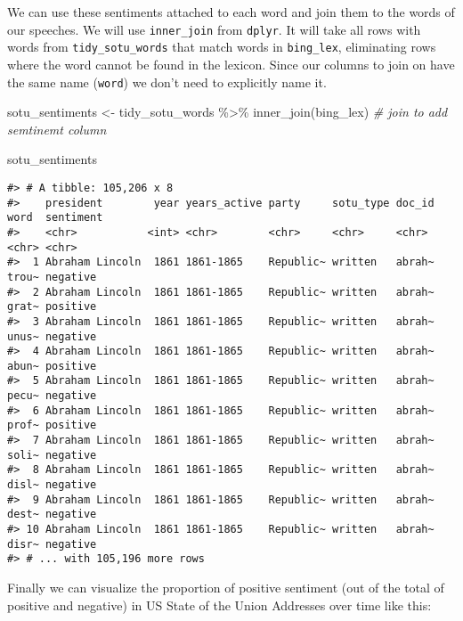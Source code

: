 \documentclass[
]{book}
\newenvironment{Shaded}{\begin{snugshade}}{\end{snugshade}}
\newcommand{\CommentTok}[1]{\textcolor[rgb]{0.56,0.35,0.01}{\textit{#1}}}
\newcommand{\FunctionTok}[1]{\textcolor[rgb]{0.00,0.00,0.00}{#1}}
\newcommand{\NormalTok}[1]{#1}
\newcommand{\OtherTok}[1]{\textcolor[rgb]{0.56,0.35,0.01}{#1}}
\newcommand{\SpecialCharTok}[1]{\textcolor[rgb]{0.00,0.00,0.00}{#1}}
\begin{document}
We can use these sentiments attached to each word and join them to the words of our speeches. We will use \texttt{inner\_join} from \texttt{dplyr}. It will take all rows with words from \texttt{tidy\_sotu\_words} that match words in \texttt{bing\_lex}, eliminating rows where the word cannot be found in the lexicon. Since our columns to join on have the same name (\texttt{word}) we don't need to explicitly name it.

\begin{Shaded}
\begin{Highlighting}[]
\NormalTok{sotu\_sentiments }\OtherTok{\textless{}{-}}\NormalTok{ tidy\_sotu\_words }\SpecialCharTok{\%\textgreater{}\%} 
  \FunctionTok{inner\_join}\NormalTok{(bing\_lex)  }\CommentTok{\# join to add semtinemt column}

\NormalTok{sotu\_sentiments}
\end{Highlighting}
\end{Shaded}

\begin{verbatim}
#> # A tibble: 105,206 x 8
#>    president        year years_active party     sotu_type doc_id word  sentiment
#>    <chr>           <int> <chr>        <chr>     <chr>     <chr>  <chr> <chr>    
#>  1 Abraham Lincoln  1861 1861-1865    Republic~ written   abrah~ trou~ negative 
#>  2 Abraham Lincoln  1861 1861-1865    Republic~ written   abrah~ grat~ positive 
#>  3 Abraham Lincoln  1861 1861-1865    Republic~ written   abrah~ unus~ negative 
#>  4 Abraham Lincoln  1861 1861-1865    Republic~ written   abrah~ abun~ positive 
#>  5 Abraham Lincoln  1861 1861-1865    Republic~ written   abrah~ pecu~ negative 
#>  6 Abraham Lincoln  1861 1861-1865    Republic~ written   abrah~ prof~ positive 
#>  7 Abraham Lincoln  1861 1861-1865    Republic~ written   abrah~ soli~ negative 
#>  8 Abraham Lincoln  1861 1861-1865    Republic~ written   abrah~ disl~ negative 
#>  9 Abraham Lincoln  1861 1861-1865    Republic~ written   abrah~ dest~ negative 
#> 10 Abraham Lincoln  1861 1861-1865    Republic~ written   abrah~ disr~ negative 
#> # ... with 105,196 more rows
\end{verbatim}

Finally we can visualize the proportion of positive sentiment (out of the total of positive and negative) in US State of the Union Addresses over time like this:
\end{document}
